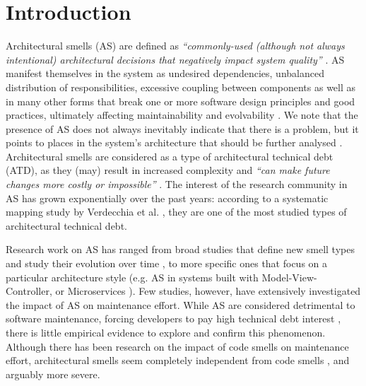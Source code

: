 \section{Introduction}
Architectural smells (AS) are defined as \emph{``commonly-used (although not always intentional) architectural decisions that negatively impact system quality''} \cite{Garcia2009}.
AS manifest themselves in the system as undesired dependencies, unbalanced distribution of responsibilities, excessive coupling between components as well as in many other forms that break one or more software design principles and good practices, ultimately affecting maintainability and evolvability \cite{Lippert2006}.
We note that the presence of AS does not always inevitably indicate that there is a problem, but it points to places in the system’s architecture that should be further analysed \cite{Lippert2006}.
Architectural smells are considered as a type of architectural technical debt (ATD), as they (may) result in increased complexity and \emph{``can make future changes more costly or impossible''} \cite{Avgeriou2016}.
The interest of the research community in AS has grown exponentially over the past years: according to a systematic mapping study by Verdecchia et al. \cite{Verdecchia2018}, they are one of the most studied types of architectural technical debt.

Research work on AS has ranged from broad studies that define new smell types and study their evolution over time \cite{Arcelli2016,Oyetoyan2015,Le2015}, to more specific ones that focus on a particular architecture style (e.g. AS in systems built with Model-View-Controller, or Microservices \cite{Neri2019}).
Few studies, however, have extensively investigated the impact of AS on maintenance effort. While AS are considered detrimental to software maintenance, forcing developers to pay high technical debt interest \cite{Garcia2009}, there is little empirical evidence to explore and confirm this phenomenon.
Although there has been research on the impact of code smells on maintenance effort, architectural smells seem completely independent from code smells \cite{Arcelli2019}, and arguably more severe. 

